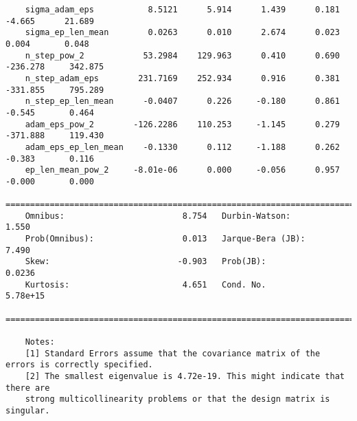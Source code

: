 \begin{verbatim}
    sigma_adam_eps           8.5121      5.914      1.439      0.181      -4.665      21.689
    sigma_ep_len_mean        0.0263      0.010      2.674      0.023       0.004       0.048
    n_step_pow_2            53.2984    129.963      0.410      0.690    -236.278     342.875
    n_step_adam_eps        231.7169    252.934      0.916      0.381    -331.855     795.289
    n_step_ep_len_mean      -0.0407      0.226     -0.180      0.861      -0.545       0.464
    adam_eps_pow_2        -126.2286    110.253     -1.145      0.279    -371.888     119.430
    adam_eps_ep_len_mean    -0.1330      0.112     -1.188      0.262      -0.383       0.116
    ep_len_mean_pow_2     -8.01e-06      0.000     -0.056      0.957      -0.000       0.000
    ==============================================================================
    Omnibus:                        8.754   Durbin-Watson:                   1.550
    Prob(Omnibus):                  0.013   Jarque-Bera (JB):                7.490
    Skew:                          -0.903   Prob(JB):                       0.0236
    Kurtosis:                       4.651   Cond. No.                     5.78e+15
    ==============================================================================
    
    Notes:
    [1] Standard Errors assume that the covariance matrix of the errors is correctly specified.
    [2] The smallest eigenvalue is 4.72e-19. This might indicate that there are
    strong multicollinearity problems or that the design matrix is singular.
\end{verbatim}

\clearpage
